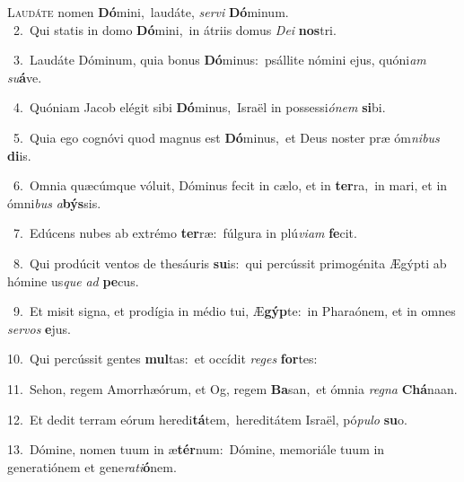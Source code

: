 \lettrine{\initial\textcolor{\initialcolor}{L}}{audáte} nomen \textbf{Dó}\-mini,~\star laudáte, \textit{ser}\-\textit{vi} \textbf{Dó}\-minum.\\
{\numbfont\textcolor{\numbcolor}{~2.}}~Qui statis in domo \textbf{Dó}\-mini,~\star in átriis domus \textit{De}\-\textit{i} \textbf{nos}\-tri.\par
{\numbfont\textcolor{\numbcolor}{~3.}}~Laudáte Dóminum, quia bonus \textbf{Dó}\-minus:~\star psállite nómini ejus, quóni\textit{am} \textit{su}\-\textbf{á}ve.\par
{\numbfont\textcolor{\numbcolor}{~4.}}~Quóniam Jacob elégit sibi \textbf{Dó}\-minus,~\star Israël in possessi\-\textit{ó}\-\textit{nem} \textbf{si}\-bi.\par
{\numbfont\textcolor{\numbcolor}{~5.}}~Quia ego cognóvi quod magnus est \textbf{Dó}\-minus,~\star et Deus noster præ óm\-\textit{ni}\-\textit{bus} \textbf{di}\-is.\par
{\numbfont\textcolor{\numbcolor}{~6.}}~Omnia quæcúmque vóluit, Dóminus fecit in cælo, et in \textbf{ter}\-ra,~\star in mari, et in ómni\textit{bus} \textit{a}\-\textbf{býs}sis.\par
{\numbfont\textcolor{\numbcolor}{~7.}}~Edúcens nubes ab extrémo \textbf{ter}\-ræ:~\star fúlgura in plú\-\textit{vi}\-\textit{am} \textbf{fe}\-cit.\par
{\numbfont\textcolor{\numbcolor}{~8.}}~Qui prodúcit ventos de thesáuris \textbf{su}\-is:~\star qui percússit primogénita Ægýpti ab hómine us\textit{que} \textit{ad} \textbf{pe}\-cus.\par
{\numbfont\textcolor{\numbcolor}{~9.}}~Et misit signa, et prodígia in médio tui, Æ\-\textbf{gýp}\-te:~\star in Pharaónem, et in omnes \textit{ser}\-\textit{vos} \textbf{e}\-jus.\par
{\numbfont\textcolor{\numbcolor}{10.}}~Qui percússit gentes \textbf{mul}\-tas:~\star et occídit \textit{re}\-\textit{ges} \textbf{for}\-tes:\par
{\numbfont\textcolor{\numbcolor}{11.}}~Sehon, regem Amorrhæórum, et Og, regem \textbf{Ba}\-san,~\star et ómnia \textit{re}\-\textit{gna} \textbf{Chá}\-naan.\par
{\numbfont\textcolor{\numbcolor}{12.}}~Et dedit terram eórum heredi\-\textbf{tá}\-tem,~\star hereditátem Israël, pó\-\textit{pu}\-\textit{lo} \textbf{su}\-o.\par
{\numbfont\textcolor{\numbcolor}{13.}}~Dómine, nomen tuum in æ\-\textbf{tér}\-num:~\star Dómine, memoriále tuum in generatiónem et gene\-\textit{ra}\-\textit{ti}\textbf{ó}nem.\par
